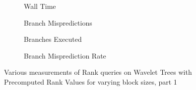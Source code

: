 




\begin{figure}\tiny

\begin{subfigure}{0.48\textwidth}
	
	\caption{Wall Time}
	\label{fig:PrecomputedRankBlockSize_Rank_WallTime}
\end{subfigure}
\hfill
\begin{subfigure}{0.48\textwidth}
	
	\caption{Branch Mispredictions}
	\label{fig:PrecomputedRankBlockSize_Rank_BranchMiss}
\end{subfigure}

\begin{subfigure}{0.48\textwidth}
	
	\caption{Branches Executed}
	\label{fig:PrecomputedRankBlockSize_Rank_BranchExe}
\end{subfigure}
\hfill	
\begin{subfigure}{0.48\textwidth}
	
	\caption{Branch Misprediction Rate}
	\label{fig:PrecomputedRankBlockSize_Rank_BranchMissRate}
\end{subfigure}
\caption{Various measurements of Rank queries on Wavelet Trees with Precomputed Rank Values for varying block sizes, part 1}
\label{fig:PrecomputedRankBlockSize_Rank}
\end{figure}

